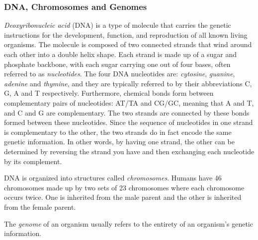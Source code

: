 \subsubsection{DNA, Chromosomes and Genomes} \label{background:biology:dna_chromosomes_and_genomes}
\textit{Deoxyribonucleic acid} (DNA) is a type of molecule that carries the genetic instructions for the development, function, and reproduction of all known living organisms.
The molecule is composed of two connected strands that wind around each other into a double helix shape.
Each strand is made up of a sugar and phosphate backbone, with each sugar carrying one out of four bases, often referred to as \textit{nucleotides}. 
The four DNA nucleotides are: \textit{cytosine}, \textit{guanine}, \textit{adenine} and \textit{thymine}, and they are typically referred to by their abbreviations C, G, A and T respectively.
Furthermore, chemical bonds form between complementary pairs of nucleotides: AT/TA and CG/GC, meaning that A and T, and C and G are complementary. 
The two strands are connected by these bonds formed between these nucleotides.
Since the sequence of nucleotides in one strand is complementary to the other, the two strands do in fact encode the same genetic information.
In other words, by having one strand, the other can be determined by reversing the strand you have and then exchanging each nucleotide by its complement.

DNA is organized into structures called \textit{chromosomes}. 
Humans have 46 chromosomes made up by two sets of 23 chromosomes where each chromosome occurs twice. One is inherited from the male parent and the other is inherited from the female parent.

The \textit{genome} of an organism usually refers to the entirety of an organism's genetic information. 

